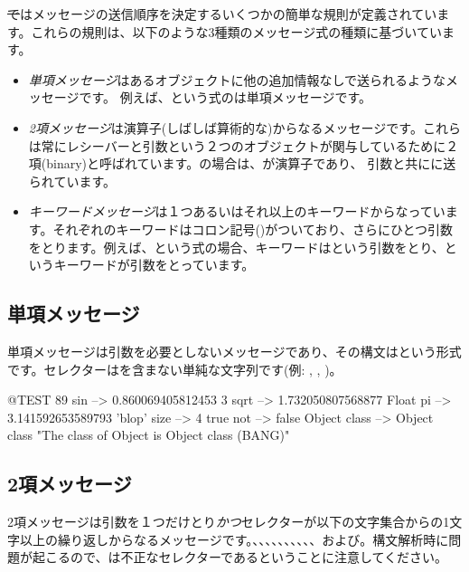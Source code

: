 \documentclass[a4paper,10pt,twoside]{book}
\begin{document}
\st ではメッセージの送信順序を決定するいくつかの簡単な規則が定義されています。これらの規則は、以下のような3種類のメッセージ式の種類に基づいています。
\begin{itemize}
\item \emph{単項メッセージ}はあるオブジェクトに他の追加情報なしで送られるようなメッセージです。 例えば、という式のは単項メッセージです。
\item  \emph{2項メッセージ}は演算子(しばしば算術的な)からなるメッセージです。これらは常にレシーバーと引数という２つのオブジェクトが関与しているために２項(binary)と呼ばれています。の場合は、\ct{+}が演算子であり、 引数と共にに送られています。
\item  \emph{キーワードメッセージ}は１つあるいはそれ以上のキーワードからなっています。それぞれのキーワードはコロン記号(\ct{:})がついており、さらにひとつ引数をとります。例えば、という式の場合、キーワードはという引数をとり、というキーワードが引数をとっています。
\end{itemize}

\subsection{単項メッセージ}
単項メッセージは引数を必要としないメッセージであり、その構文はという形式です。セレクターは\ct{:}を含まない単純な文字列です(例: , , )。
\begin{code}{@TEST}
89 sin           --> 0.860069405812453
3 sqrt           --> 1.732050807568877
Float pi         --> 3.141592653589793
'blop' size     --> 4
true not        --> false
Object class --> Object class  "The class of Object is Object class (BANG)"
\end{code}


\subsection{2項メッセージ} 
2項メッセージは引数を１つだけとり\emph{かつ}セレクターが以下の文字集合からの1文字以上の繰り返しからなるメッセージです。\ct{+}、\ct{-}、\ct{*}、\ct{/}、\ct{&}、\ct{=}、\ct{>}、\ct{|}、\ct{<}、\ct{~}、および。構文解析時に問題が起こるので、\ct{--}は不正なセレクターであるということに注意してください。
\end{document}
